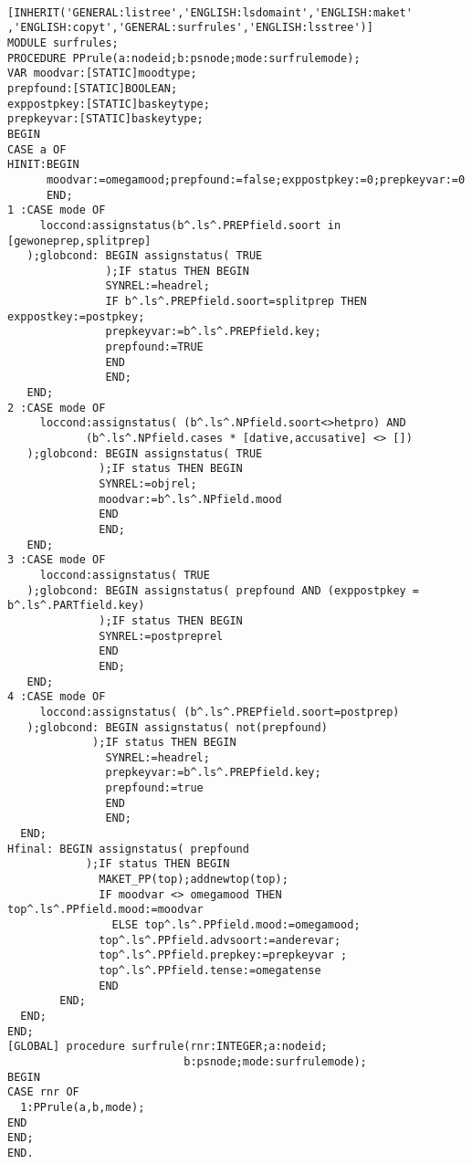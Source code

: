 \begin{verbatim}

[INHERIT('GENERAL:listree','ENGLISH:lsdomaint','ENGLISH:maket'
,'ENGLISH:copyt','GENERAL:surfrules','ENGLISH:lsstree')]
MODULE surfrules;
PROCEDURE PPrule(a:nodeid;b:psnode;mode:surfrulemode);
VAR moodvar:[STATIC]moodtype;
prepfound:[STATIC]BOOLEAN;
exppostpkey:[STATIC]baskeytype;
prepkeyvar:[STATIC]baskeytype;
BEGIN
CASE a OF
HINIT:BEGIN
      moodvar:=omegamood;prepfound:=false;exppostpkey:=0;prepkeyvar:=0
      END;
1 :CASE mode OF
     loccond:assignstatus(b^.ls^.PREPfield.soort in [gewoneprep,splitprep]
   );globcond: BEGIN assignstatus( TRUE
               );IF status THEN BEGIN
               SYNREL:=headrel;
               IF b^.ls^.PREPfield.soort=splitprep THEN exppostkey:=postpkey;
               prepkeyvar:=b^.ls^.PREPfield.key;
               prepfound:=TRUE
               END
               END;
   END;
2 :CASE mode OF
     loccond:assignstatus( (b^.ls^.NPfield.soort<>hetpro) AND
            (b^.ls^.NPfield.cases * [dative,accusative] <> [])
   );globcond: BEGIN assignstatus( TRUE
              );IF status THEN BEGIN
              SYNREL:=objrel;
              moodvar:=b^.ls^.NPfield.mood
              END
              END;
   END;
3 :CASE mode OF
     loccond:assignstatus( TRUE
   );globcond: BEGIN assignstatus( prepfound AND (exppostpkey = b^.ls^.PARTfield.key)
              );IF status THEN BEGIN
              SYNREL:=postpreprel
              END
              END;
   END;
4 :CASE mode OF
     loccond:assignstatus( (b^.ls^.PREPfield.soort=postprep)
   );globcond: BEGIN assignstatus( not(prepfound)
             );IF status THEN BEGIN
               SYNREL:=headrel;
               prepkeyvar:=b^.ls^.PREPfield.key;
               prepfound:=true
               END
               END;
  END;
Hfinal: BEGIN assignstatus( prepfound
            );IF status THEN BEGIN
              MAKET_PP(top);addnewtop(top);
              IF moodvar <> omegamood THEN top^.ls^.PPfield.mood:=moodvar
                ELSE top^.ls^.PPfield.mood:=omegamood;
              top^.ls^.PPfield.advsoort:=anderevar;
              top^.ls^.PPfield.prepkey:=prepkeyvar ;
              top^.ls^.PPfield.tense:=omegatense
              END
        END;
  END;
END;
[GLOBAL] procedure surfrule(rnr:INTEGER;a:nodeid;
                           b:psnode;mode:surfrulemode);
BEGIN
CASE rnr OF
  1:PPrule(a,b,mode);
END
END;
END.

\end{verbatim}
